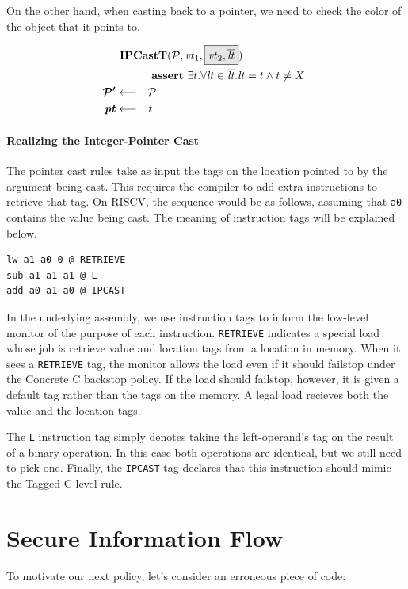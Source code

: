 \documentclass[acmsmall,review,anonymous]{acmart}\settopmatter{printfolios=true,printccs=false,printacmref=false}
\begin{document}
On the other hand, when casting back to a pointer, we need to check the color
of the object that it points to.

\[\begin{aligned}
\truledef{\ipcastt}
\assert{\exists t . \forall \lt \in \overline{\lt} . \lt = t \land t \not = X}
\settag{\PCT'}{\PCT}
\settag{\pt}{t}
\end{aligned}\]

\paragraph{Realizing the Integer-Pointer Cast}

The pointer cast rules take as input the tags on the location pointed to by the
argument being cast. This requires the compiler to add extra instructions to retrieve that tag.
On RISCV, the sequence would be as follows, assuming that {\tt a0} contains the
value being cast. The meaning of instruction tags will be explained below.

\begin{verbatim}
lw a1 a0 0 @ RETRIEVE
sub a1 a1 a1 @ L
add a0 a1 a0 @ IPCAST
\end{verbatim}

In the underlying assembly, we use instruction tags to inform the low-level monitor
of the purpose of each instruction. {\tt RETRIEVE} indicates a special load
whose job is retrieve value and location tags from a location in memory. When it sees
a {\tt RETRIEVE} tag, the monitor allows the load even if it should failstop under the
Concrete C backstop policy. If the load should failstop, however, it is given a default
tag rather than the tags on the memory. A legal load recieves both the value and the location
tags.

The {\tt L} instruction tag simply denotes taking the left-operand's tag on the result of a
binary operation. In this case both operations are identical, but we still need to pick one.
Finally, the {\tt IPCAST} tag declares that this instruction should mimic the Tagged-C-level
rule.

\section{Secure Information Flow}
\label{sec:SIF}

To motivate our next policy, let's consider an erroneous piece of code:
\end{document}
